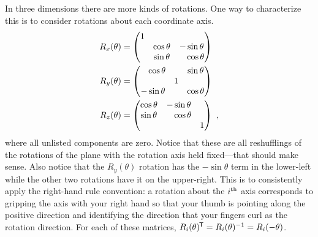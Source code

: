 \documentclass[12pt, oneside]{report}    %
\begin{document}
\begin{example}
In three dimensions there are more kinds of rotations. One way to characterize this is to consider rotations about each coordinate axis. 
\begin{align}
    R_x(\theta) &= 
    \begin{pmatrix}
        1 & & \\
        &  \cos\theta & -\sin\theta \\
        & \sin\theta &  \pp\cos\theta 
    \end{pmatrix}
    \\
    R_y(\theta) &= 
    \begin{pmatrix}
        \pp \cos\theta & &\sin\theta \\
        & 1 & \\
        -\sin\theta& & \cos\theta
    \end{pmatrix}
    \\
    R_z(\theta) &= 
    \begin{pmatrix}
       \cos\theta & - \sin\theta & \\
        \sin\theta &\pp \cos\theta & \\
        & & 1
    \end{pmatrix}\ ,
    \label{eq:3D:rotation:matrices}
\end{align}
where all unlisted components are zero. Notice that these are all reshufflings of the rotations of the plane with the rotation axis held fixed---that should make sense. Also notice that the $R_y(\theta)$ rotation has the $-\sin\theta$ term in the lower-left while the other two rotations have it on the upper-right. This is to consistently apply the right-hand rule convention: a rotation about the $i^\textnormal{th}$ axis corresponds to gripping the axis with your right hand so that your thumb is pointing along the positive direction and identifying the direction that your fingers curl as the rotation direction. For each of these matrices, $R_i(\theta)^{\mkern-1.5mu\mathsf{T}} = R_i(\theta)^{-1} = R_i(-\theta)$. 
\end{example}
\end{document}
